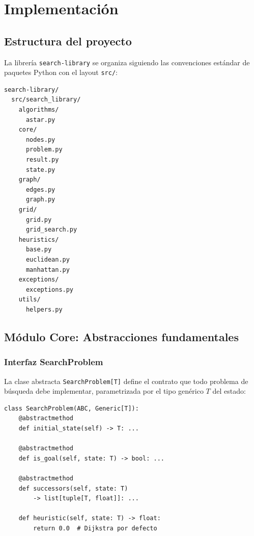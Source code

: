 \section{Implementación}

\subsection{Estructura del proyecto}

La librería \texttt{search-library} se organiza siguiendo las convenciones estándar de paquetes Python con el layout \texttt{src/}:

\begin{lstlisting}[language={}, caption={Estructura del proyecto}, label={lst:structure}]
search-library/
  src/search_library/
    algorithms/
      astar.py
    core/
      nodes.py
      problem.py
      result.py
      state.py
    graph/
      edges.py
      graph.py
    grid/
      grid.py
      grid_search.py
    heuristics/
      base.py
      euclidean.py
      manhattan.py
    exceptions/
      exceptions.py
    utils/
      helpers.py
\end{lstlisting}

\subsection{Módulo Core: Abstracciones fundamentales}

\subsubsection{Interfaz SearchProblem}

La clase abstracta \texttt{SearchProblem[T]} define el contrato que todo problema de búsqueda debe implementar, parametrizada por el tipo genérico $T$ del estado:

\begin{lstlisting}[caption={Interfaz abstracta del problema de búsqueda}, label={lst:problem}]
class SearchProblem(ABC, Generic[T]):
    @abstractmethod
    def initial_state(self) -> T: ...

    @abstractmethod
    def is_goal(self, state: T) -> bool: ...

    @abstractmethod
    def successors(self, state: T) 
        -> list[tuple[T, float]]: ...

    def heuristic(self, state: T) -> float:
        return 0.0  # Dijkstra por defecto
\end{lstlisting}

